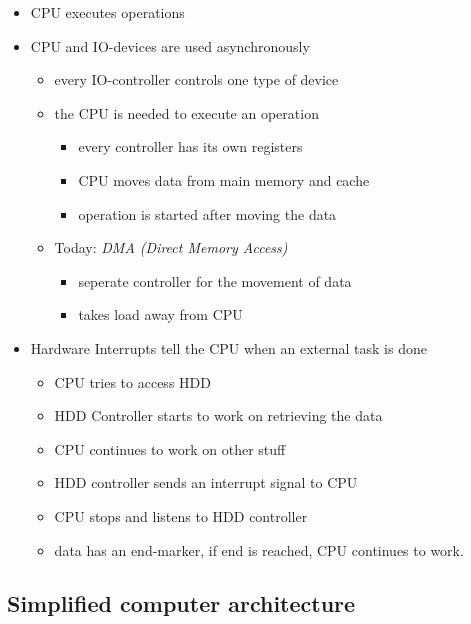 \documentclass[
]{article}
\providecommand{\tightlist}{%
  \setlength{\itemsep}{0pt}\setlength{\parskip}{0pt}}
\begin{document}
\begin{itemize}
\tightlist
\item
  CPU executes operations
\item
  CPU and IO-devices are used asynchronously

  \begin{itemize}
  \tightlist
  \item
    every IO-controller controls one type of device
  \item
    the CPU is needed to execute an operation

    \begin{itemize}
    \tightlist
    \item
      every controller has its own registers
    \item
      CPU moves data from main memory and cache
    \item
      operation is started after moving the data
    \end{itemize}
  \item
    Today: \emph{DMA (Direct Memory Access)}

    \begin{itemize}
    \tightlist
    \item
      seperate controller for the movement of data
    \item
      takes load away from CPU
    \end{itemize}
  \end{itemize}
\item
  Hardware Interrupts tell the CPU when an external task is done

  \begin{itemize}
  \tightlist
  \item
    CPU tries to access HDD
  \item
    HDD Controller starts to work on retrieving the data
  \item
    CPU continues to work on other stuff
  \item
    HDD controller sends an interrupt signal to CPU
  \item
    CPU stops and listens to HDD controller
  \item
    data has an end-marker, if end is reached, CPU continues to work.
  \end{itemize}
\end{itemize}

\hypertarget{simplified-computer-architecture}{%
\subsection{Simplified computer
architecture}\label{simplified-computer-architecture}}
\end{document}
